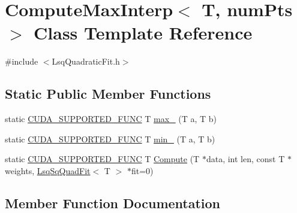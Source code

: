 \hypertarget{class_compute_max_interp}{}\section{Compute\+Max\+Interp$<$ T, num\+Pts $>$ Class Template Reference}
\label{class_compute_max_interp}


{\ttfamily \#include $<$Lsq\+Quadratic\+Fit.\+h$>$}

\subsection*{Static Public Member Functions}
\begin{DoxyCompactItemize}
\item 
static \hyperlink{gpu__utils_8h_a69f41cb6c15f0e34b0889a5f6d5aae32}{C\+U\+D\+A\+\_\+\+S\+U\+P\+P\+O\+R\+T\+E\+D\+\_\+\+F\+U\+NC} T \hyperlink{class_compute_max_interp_aca1d7eb7e01f35799fb57a6ba12703a2}{max\+\_\+} (T a, T b)
\item 
static \hyperlink{gpu__utils_8h_a69f41cb6c15f0e34b0889a5f6d5aae32}{C\+U\+D\+A\+\_\+\+S\+U\+P\+P\+O\+R\+T\+E\+D\+\_\+\+F\+U\+NC} T \hyperlink{class_compute_max_interp_a7182479e13541d98b5d0ba6f65eff902}{min\+\_\+} (T a, T b)
\item 
static \hyperlink{gpu__utils_8h_a69f41cb6c15f0e34b0889a5f6d5aae32}{C\+U\+D\+A\+\_\+\+S\+U\+P\+P\+O\+R\+T\+E\+D\+\_\+\+F\+U\+NC} T \hyperlink{class_compute_max_interp_aa1ec2481d8a866f624f05ba53fb2d3bc}{Compute} (T $\ast$data, int len, const T $\ast$weights, \hyperlink{class_lsq_sq_quad_fit}{Lsq\+Sq\+Quad\+Fit}$<$ T $>$ $\ast$fit=0)
\end{DoxyCompactItemize}


\subsection{Member Function Documentation}

